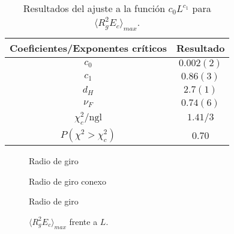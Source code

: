\begin{table}[h]
\centering
\begin{tabular}{|c|c|}\hline
 Coeficientes/Exponentes críticos & Resultado \\\hline
 $c_0$         & $0.002(2) $ \\ \hline
 $c_1$         & $0.86(3)$ \\ \hline
$d_H$      & $2.7(1)$ \\ \hline
$\nu_F $        & $0.74(6)$ \\ \hline
$\chi_c^2/\mathrm{ngl}$ &  $1.41/3$   \\ \hline
 $P(\chi^2>\chi_c^2)$&  $0.70$\\ \hline
\end{tabular}
\caption{Resultados del ajuste a la función $c_0L^{c_1}$ para $\langle R_g^2 E_c\rangle_{max}$.}\label{max_varradio-giro-tab}
\end{table}

\begin{figure}[h]
  \centering
  
  \caption{Radio de giro}\label{radio-giro-fig}
\end{figure}

\begin{figure}[h]
  \centering
  
  \caption{Radio de giro conexo}\label{varradio-giro-fig}
\end{figure}

\begin{figure}[h]
  \centering
  
  \caption{Radio de giro}\label{max_varradio-giro-fig}
\end{figure}

\begin{figure}[h]
  \centering
  
  \caption{$\langle R_g^2 E_c\rangle_{max}$ frente a $L$.}\label{max_varradio-giro-L-fig}
\end{figure}

%  
\clearpage
